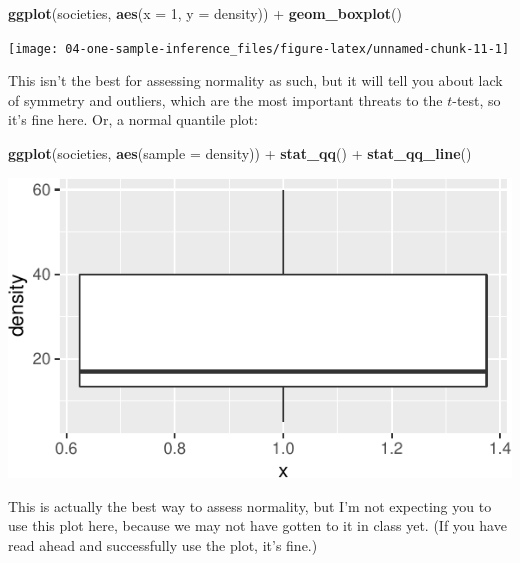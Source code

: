 \documentclass[]{tufte-book}
\newenvironment{Shaded}{}{}
\newcommand{\DataTypeTok}[1]{\textcolor[rgb]{0.56,0.13,0.00}{#1}}
\newcommand{\DecValTok}[1]{\textcolor[rgb]{0.25,0.63,0.44}{#1}}
\newcommand{\KeywordTok}[1]{\textcolor[rgb]{0.00,0.44,0.13}{\textbf{#1}}}
\newcommand{\NormalTok}[1]{#1}
\newcommand{\OperatorTok}[1]{\textcolor[rgb]{0.40,0.40,0.40}{#1}}
\newcommand{\StringTok}[1]{\textcolor[rgb]{0.25,0.44,0.63}{#1}}
\theoremstyle{definition}
\theoremstyle{definition}
\theoremstyle{definition}
\theoremstyle{remark}
\begin{document}
\begin{Shaded}
\begin{Highlighting}[]
\KeywordTok{ggplot}\NormalTok{(societies, }\KeywordTok{aes}\NormalTok{(}\DataTypeTok{x =} \DecValTok{1}\NormalTok{, }\DataTypeTok{y =}\NormalTok{ density)) }\OperatorTok{+}\StringTok{ }\KeywordTok{geom_boxplot}\NormalTok{()}
\end{Highlighting}
\end{Shaded}

\texttt{[image: 04-one-sample-inference\_files/figure-latex/unnamed-chunk-11-1]}

This isn't the best for assessing normality as such, but it will tell
you about lack of symmetry and outliers, which are the most important
threats to the \(t\)-test, so it's fine here. Or, a normal quantile
plot:

\begin{Shaded}
\begin{Highlighting}[]
\KeywordTok{ggplot}\NormalTok{(societies, }\KeywordTok{aes}\NormalTok{(}\DataTypeTok{sample =}\NormalTok{ density)) }\OperatorTok{+}\StringTok{ }\KeywordTok{stat_qq}\NormalTok{() }\OperatorTok{+}\StringTok{ }
\StringTok{    }\KeywordTok{stat_qq_line}\NormalTok{()}
\end{Highlighting}
\end{Shaded}

\includegraphics{04-one-sample-inference_files/figure-latex/unnamed-chunk-12-1}

This is actually the best way to assess normality, but I'm not expecting
you to use this plot here, because we may not have gotten to it in class
yet. (If you have read ahead and successfully use the plot, it's fine.)
\end{document}

